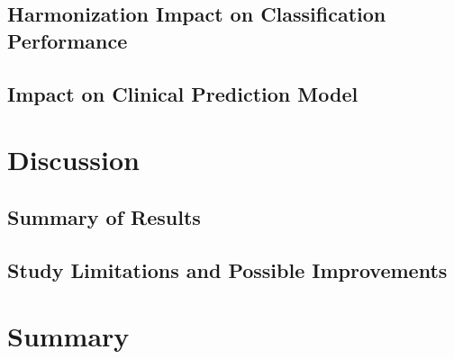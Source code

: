 \documentclass{bachelor2025eng}
\begin{document}
    \section{Harmonization Impact on Classification Performance}

    \section{Impact on Clinical Prediction Model}

\chapter{Discussion}
    \section{Summary of Results}

    \section{Study Limitations and Possible Improvements}

\chapter{Summary} 


 


\appendix
\end{document}
